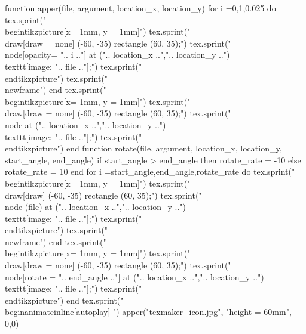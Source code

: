 
\usepackage{etoolbox}

\begin{mainpage}{2}{2}
\begin{luacode}
function apper(file, argument, location_x, location_y)
	for i =0,1,0.025 do
		tex.sprint("\\begin{tikzpicture}[x= 1mm, y = 1mm]")
		tex.sprint("\\draw[draw = none] (-60, -35) rectangle (60, 35);")
		tex.sprint("\\node[opacity= ".. i .."] at (".. location_x ..",".. location_y ..") {\\texttt{[image: ".. file .."]}};")
		tex.sprint("\\end{tikzpicture}")
		tex.sprint("\\newframe")
	end
	tex.sprint("\\begin{tikzpicture}[x= 1mm, y = 1mm]")
	tex.sprint("\\draw[draw = none] (-60, -35) rectangle (60, 35);")
	tex.sprint("\\node at (".. location_x ..",".. location_y ..") {\\texttt{[image: ".. file .."]}};")
	tex.sprint("\\end{tikzpicture}")
end
function rotate(file, argument, location_x, location_y, start_angle, end_angle)
	if start_angle > end_angle then
		rotate_rate = -10
	else
		rotate_rate = 10
	end
	for i =start_angle,end_angle,rotate_rate do
		tex.sprint("\\begin{tikzpicture}[x= 1mm, y = 1mm]")
		tex.sprint("\\draw[draw] (-60, -35) rectangle (60, 35);")
		tex.sprint("\\node (file) at (".. location_x ..",".. location_y ..") {\\texttt{[image: ".. file .."]}};")
		tex.sprint("\\end{tikzpicture}")
		tex.sprint("\\newframe")
	end
	tex.sprint("\\begin{tikzpicture}[x= 1mm, y = 1mm]")
	tex.sprint("\\draw[draw = none] (-60, -35) rectangle (60, 35);")
	tex.sprint("\\node[rotate = ".. end_angle .."] at (".. location_x ..",".. location_y ..") {\\texttt{[image: ".. file .."]}};")
	tex.sprint("\\end{tikzpicture}")
end
tex.sprint("\\begin{animateinline}[autoplay]{30}")
apper("texmaker_icon.jpg", "height = 60mm", 0,0)

\end{luacode}
\end{mainpage}
